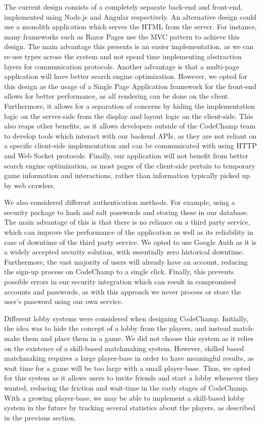 \documentclass[12pt, titlepage]{article}
\begin{document}
\begin{enumerate}
  The current design consists of a completely separate back-end and front-end, implemented using Node.js and Angular respectively. An alternative design could use a monolith application which serves the HTML from the server. For instance, many frameworks such as Razor Pages use the MVC pattern to achieve this design. The main advantage this presents is an easier implementation, as we can re-use types across the system and not spend time implementing abstraction layers for communication protocols. Another advantage is that a multi-page application will have better search engine optimization. However, we opted for this design as the usage of a Single Page Application framework for the front-end allows for better performance, as all rendering can be done on the client. Furthermore, it allows for a separation of concerns by hiding the implementation logic on the server-side from the display and layout logic on the client-side. This also reaps other benefits, as it allows developers outside of the CodeChamp team to develop tools which interact with our backend APIs, as they are not reliant on a specific client-side implementation and can be communicated with using HTTP and Web Socket protocols. Finally, our application will not benefit from better search engine optimization, as most pages of the client-side pertain to temporary game information and interactions, rather than information typically picked up by web crawlers.

  We also considered different authentication methods. For example, using a security package to hash and salt passwords and storing these in our database. The main advantage of this is that there is no reliance on a third party service, which can improve the performance of the application as well as its reliability in case of downtime of the third party service. We opted to use Google Auth as it is a widely accepted security solution, with essentially zero historical downtime. Furthermore, the vast majority of users will already have an account, reducing the sign-up process on CodeChamp to a single click. Finally, this prevents possible errors in our security integration which can result in compromised accounts and passwords, as with this approach we never process or store the user's password using our own service.

  Different lobby systems were considered when designing CodeChamp. Initially, the idea was to hide the concept of a lobby from the players, and instead match-make them and place them in a game. We did not choose this system as it relies on the existence of a skill-based matchmaking system. However, skilled based matchmaking requires a large player-base in order to have meaningful results, as wait time for a game will be too large with a small player-base. Thus, we opted for this system as it allows users to invite friends and start a lobby whenever they wanted, reducing the friction and wait-time in the early stages of CodeChamp. With a growing player-base, we may be able to implement a skill-based lobby system in the future by tracking several statistics about the players, as described in the previous section.
  
\end{enumerate}
\end{document}
